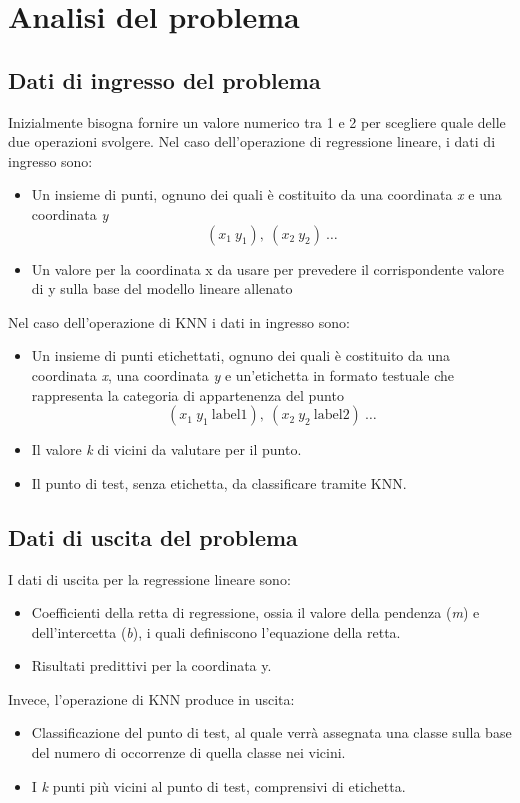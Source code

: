 \documentclass[11pt]{article}
\theoremstyle{definition}
\begin{document}
\newpage

\section{Analisi del problema}

\subsection{Dati di ingresso del problema}
Inizialmente bisogna fornire un valore numerico tra 1 e 2 per scegliere quale delle due operazioni svolgere. Nel caso dell'operazione di regressione lineare, i dati di ingresso sono:
\begin{itemize}
\item Un insieme di punti, ognuno dei quali è costituito da una coordinata \textit{x} e una coordinata \textit{y} 
$$(x_1 \ y_1),\  (x_2 \ y_2) \ \dots $$
\item Un valore per la coordinata x da usare per prevedere il corrispondente valore di y sulla base del modello lineare allenato
\end{itemize}
Nel caso dell'operazione di KNN i dati in ingresso sono:
\begin{itemize}
\item Un insieme di punti etichettati, ognuno dei quali è costituito da una coordinata \textit{x}, una coordinata \textit{y} e un'etichetta in formato testuale che rappresenta la categoria di appartenenza del punto
$$
(x_1 \ y_1 \ \text{label1}),\  (x_2 \ y_2 \ \text{label2}) \ \dots 
$$
\item Il valore \textit{k} di vicini da valutare per il punto.
\item Il punto di test, senza etichetta, da classificare tramite KNN.
\end{itemize}

\subsection{Dati di uscita del problema}
I dati di uscita per la regressione lineare sono:
\begin{itemize}
\item Coefficienti della retta di regressione, ossia il valore della pendenza (\textit{m}) e dell'intercetta (\textit{b}), i quali definiscono l'equazione della retta.
\item Risultati predittivi per la coordinata y.
\end{itemize}
Invece, l'operazione di KNN produce in uscita:
\begin{itemize}
\item Classificazione del punto di test, al quale verrà assegnata una classe sulla base del numero di occorrenze di quella classe nei vicini.
\item I \textit{k} punti più vicini al punto di test, comprensivi di etichetta.
\end{itemize}
\end{document}
